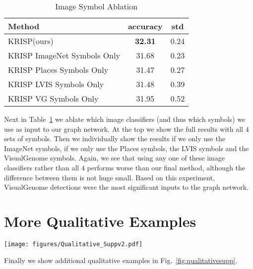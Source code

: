 \documentclass[final]{cvpr}
\providecommand{\ModelName}{KRISP\xspace}
\providecommand{\MMBERTBase}{Multi-modal BERT\xspace}
\begin{document}
\begin{table}[h]
\begin{center}
\begin{tabular}{@{}lcc@{}}
\toprule
Method & accuracy & std\\ \midrule
\ModelName (ours) & \bf{32.31} & 0.24 \\
\ModelName ImageNet Symbols Only & 31.68 & 0.23 \\
\ModelName Places Symbols Only & 31.47 & 0.27 \\
\ModelName LVIS Symbols Only & 31.48 & 0.39 \\
\ModelName VG Symbols Only & 31.95 & 0.52\\
\bottomrule
\end{tabular}
\end{center}
\caption{Image Symbol Ablation}
\label{table:imgablation}
\end{table}

Next in Table~\ref{table:imgablation} we ablate which image classifiers (and thus which symbols) we use as input to our graph network. At the top we show the full results with all $4$ sets of symbols. Then we individually show the results if we only use the ImageNet symbols, if we only use the Places symbols, the LVIS symbols and the VisualGenome symbols. Again, we see that using any one of these image classifiers rather than all $4$ performs worse than our final method, although the difference between them is not huge small. Based on this experiment, VisualGenome detections were the most significant inputs to the graph network.

\section{More Qualitative Examples}
\label{appx:qual}
\begin{figure*}[t]
\centering
\texttt{[image: figures/Qualitative\_Suppv2.pdf]}
\caption{More qualitative examples from \ModelName. Showing predictions by our model and the implicit knowledge baseline \MMBERTBase. We show the question, image, and answers given by both models. We also show knowledge in the graph related to the question, answers or image that seemed most relevant.}
\label{fig:qualitativesupp}
\end{figure*}

Finally we show additional qualitative examples in Fig.~\ref{fig:qualitativesupp}. 
\end{document}
